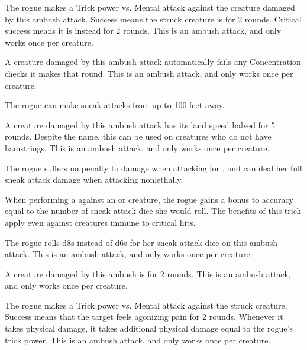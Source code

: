         The rogue makes a Trick power vs. Mental attack against the creature damaged by this ambush attack.
        Success means the struck creature is \dazed for 2 rounds.
        Critical success means it is instead \confused for 2 rounds.
        This is an ambush attack, and only works once per creature.

        A creature damaged by this ambush attack automatically fails any Concentration checks it makes that round.
        This is an ambush attack, and only works once per creature.

        The rogue can make sneak attacks from up to 100 feet away.

        A creature damaged by this ambush attack has its land speed halved for 5 rounds.
        Despite the name, this can be used on creatures who do not have hamstrings.
        This is an ambush attack, and only works once per creature.

        The rogue suffers no penalty to damage when attacking for , and can deal her full sneak attack damage when attacking nonlethally.


        When performing a  against an  or \unaware creature, the rogue gains a bonus to accuracy equal to the number of sneak attack dice she would roll.
        The benefits of this trick apply even against creatures immune to critical hits.

        The rogue rolls d8s instead of d6s for her sneak attack dice on this ambush attack.
        This is an ambush attack, and only works once per creature.

        A creature damaged by this ambush is \immobilized for 2 rounds.
        This is an ambush attack, and only works once per creature.

        The rogue makes a Trick power vs. Mental attack against the struck creature.
        Success means that the target feels agonizing pain for 2 rounds.
        Whenever it takes physical damage, it takes additional physical damage equal to the rogue's trick power.
        This is an ambush attack, and only works once per creature.

